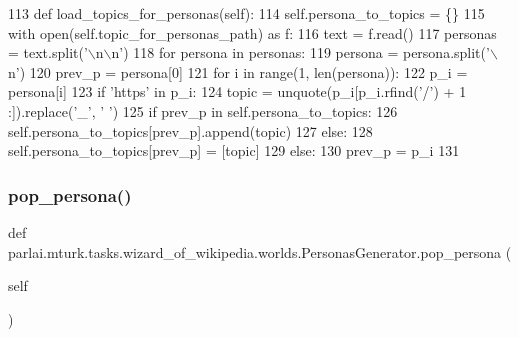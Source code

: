 \begin{DoxyCode}
113     \textcolor{keyword}{def }load\_topics\_for\_personas(self):
114         self.persona\_to\_topics = \{\}
115         with open(self.topic\_for\_personas\_path) \textcolor{keyword}{as} f:
116             text = f.read()
117             personas = text.split(\textcolor{stringliteral}{'\(\backslash\)n\(\backslash\)n'})
118             \textcolor{keywordflow}{for} persona \textcolor{keywordflow}{in} personas:
119                 persona = persona.split(\textcolor{stringliteral}{'\(\backslash\)n'})
120                 prev\_p = persona[0]
121                 \textcolor{keywordflow}{for} i \textcolor{keywordflow}{in} range(1, len(persona)):
122                     p\_i = persona[i]
123                     \textcolor{keywordflow}{if} \textcolor{stringliteral}{'https'} \textcolor{keywordflow}{in} p\_i:
124                         topic = unquote(p\_i[p\_i.rfind(\textcolor{stringliteral}{'/'}) + 1 :]).replace(\textcolor{stringliteral}{'\_'}, \textcolor{stringliteral}{' '})
125                         \textcolor{keywordflow}{if} prev\_p \textcolor{keywordflow}{in} self.persona\_to\_topics:
126                             self.persona\_to\_topics[prev\_p].append(topic)
127                         \textcolor{keywordflow}{else}:
128                             self.persona\_to\_topics[prev\_p] = [topic]
129                     \textcolor{keywordflow}{else}:
130                         prev\_p = p\_i
131 
\end{DoxyCode}
\mbox{\label{classparlai_1_1mturk_1_1tasks_1_1wizard__of__wikipedia_1_1worlds_1_1PersonasGenerator_a587c095d1aa21abacac238160ead6dd0}} 
\subsubsection{\texorpdfstring{pop\+\_\+persona()}{pop\_persona()}}
{\footnotesize\ttfamily def parlai.\+mturk.\+tasks.\+wizard\+\_\+of\+\_\+wikipedia.\+worlds.\+Personas\+Generator.\+pop\+\_\+persona (\begin{DoxyParamCaption}\item[{}]{self }\end{DoxyParamCaption})}



